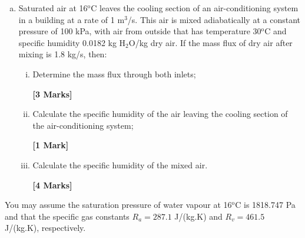 \documentclass[calculator,steamtables,refrigeranttables,psychrometricchart,datasheet,sample]{exam}
\begin{document}
\begin{question}
\begin{enumerate}[(a)]
\item Saturated air at 16$^{\text{o}}$C leaves the cooling section of an air-conditioning system in a building at a rate of 1 m$^{3}$/s. This air is mixed adiabatically at a constant pressure of 100 kPa, with air from outside that has temperature 30$^{\text{o}}$C and specific humidity 0.0182 kg H$_{2}$O/kg dry air. If the mass flux of dry air after mixing is 1.8 kg/s, then:
\begin{enumerate}[(i)]
\item Determine the mass flux through both inlets;
\begin{flushright}
{\bf [3 Marks]}
\end{flushright} 
\item Calculate the specific humidity of the air leaving the cooling section of the air-conditioning system;
\begin{flushright}
{\bf [1 Mark]}
\end{flushright} 
\item Calculate the specific humidity of the mixed air. 
\begin{flushright}
{\bf [4 Marks]}
\end{flushright} 
\end{enumerate}
\end{enumerate}
You may assume the saturation pressure of water vapour at 16$^{\text{o}}$C is 1818.747 Pa and that the specific gas constants $R_{a}=287.1$ J/(kg.K) and $R_{v}=461.5$ J/(kg.K), respectively.
\end{question}


\clearpage
\end{document}
